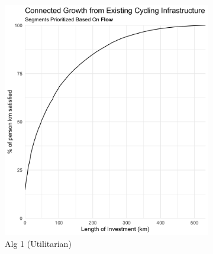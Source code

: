 \documentclass[
]{article}
\begin{document}
\begin{figure} [h!]
\centering
\captionsetup{font=footnotesize,labelfont=footnotesize} %
\begin{subfigure}{.45\textwidth}
  \centering
  \includegraphics[width=1\linewidth]{../../data/Manchester/Plots/Growth_Results/growth_existing_infra_satisfied_km_all_flow_column.png}
  \caption{Alg 1 (Utilitarian)}
  \label{fig:growth_utilitarian_satisfied_all}
\end{subfigure}
\begin{subfigure}{.45\textwidth}
  \centering

\end{subfigure}
\end{figure}
\end{document}
